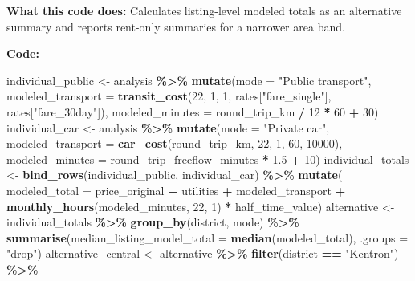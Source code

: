 \documentclass[
]{article}
\newenvironment{Shaded}{\begin{snugshade}}{\end{snugshade}}
\newcommand{\AttributeTok}[1]{\textcolor[rgb]{0.13,0.29,0.53}{#1}}
\newcommand{\DecValTok}[1]{\textcolor[rgb]{0.00,0.00,0.81}{#1}}
\newcommand{\FloatTok}[1]{\textcolor[rgb]{0.00,0.00,0.81}{#1}}
\newcommand{\FunctionTok}[1]{\textcolor[rgb]{0.13,0.29,0.53}{\textbf{#1}}}
\newcommand{\NormalTok}[1]{#1}
\newcommand{\OtherTok}[1]{\textcolor[rgb]{0.56,0.35,0.01}{#1}}
\newcommand{\SpecialCharTok}[1]{\textcolor[rgb]{0.81,0.36,0.00}{\textbf{#1}}}
\newcommand{\StringTok}[1]{\textcolor[rgb]{0.31,0.60,0.02}{#1}}
\begin{document}
\textbf{What this code does:} Calculates listing-level modeled totals as
an alternative summary and reports rent-only summaries for a narrower
area band.

\textbf{Code:}

\begin{Shaded}
\begin{Highlighting}[]
\NormalTok{individual\_public }\OtherTok{\textless{}{-}}\NormalTok{ analysis }\SpecialCharTok{\%\textgreater{}\%} \FunctionTok{mutate}\NormalTok{(}\AttributeTok{mode =} \StringTok{"Public transport"}\NormalTok{,}
  \AttributeTok{modeled\_transport =} \FunctionTok{transit\_cost}\NormalTok{(}\DecValTok{22}\NormalTok{, }\DecValTok{1}\NormalTok{, }\DecValTok{1}\NormalTok{, rates[}\StringTok{"fare\_single"}\NormalTok{], rates[}\StringTok{"fare\_30day"}\NormalTok{]),}
  \AttributeTok{modeled\_minutes =}\NormalTok{ round\_trip\_km }\SpecialCharTok{/} \DecValTok{12} \SpecialCharTok{*} \DecValTok{60} \SpecialCharTok{+} \DecValTok{30}\NormalTok{)}
\NormalTok{individual\_car }\OtherTok{\textless{}{-}}\NormalTok{ analysis }\SpecialCharTok{\%\textgreater{}\%} \FunctionTok{mutate}\NormalTok{(}\AttributeTok{mode =} \StringTok{"Private car"}\NormalTok{,}
  \AttributeTok{modeled\_transport =} \FunctionTok{car\_cost}\NormalTok{(round\_trip\_km, }\DecValTok{22}\NormalTok{, }\DecValTok{1}\NormalTok{, }\DecValTok{60}\NormalTok{, }\DecValTok{10000}\NormalTok{),}
  \AttributeTok{modeled\_minutes =}\NormalTok{ round\_trip\_freeflow\_minutes }\SpecialCharTok{*} \FloatTok{1.5} \SpecialCharTok{+} \DecValTok{10}\NormalTok{)}
\NormalTok{individual\_totals }\OtherTok{\textless{}{-}} \FunctionTok{bind\_rows}\NormalTok{(individual\_public, individual\_car) }\SpecialCharTok{\%\textgreater{}\%} \FunctionTok{mutate}\NormalTok{(}
  \AttributeTok{modeled\_total =}\NormalTok{ price\_original }\SpecialCharTok{+}\NormalTok{ utilities }\SpecialCharTok{+}\NormalTok{ modeled\_transport }\SpecialCharTok{+}
    \FunctionTok{monthly\_hours}\NormalTok{(modeled\_minutes, }\DecValTok{22}\NormalTok{, }\DecValTok{1}\NormalTok{) }\SpecialCharTok{*}\NormalTok{ half\_time\_value)}
\NormalTok{alternative }\OtherTok{\textless{}{-}}\NormalTok{ individual\_totals }\SpecialCharTok{\%\textgreater{}\%} \FunctionTok{group\_by}\NormalTok{(district, mode) }\SpecialCharTok{\%\textgreater{}\%}
  \FunctionTok{summarise}\NormalTok{(}\AttributeTok{median\_listing\_model\_total =} \FunctionTok{median}\NormalTok{(modeled\_total), }\AttributeTok{.groups =} \StringTok{"drop"}\NormalTok{)}
\NormalTok{alternative\_central }\OtherTok{\textless{}{-}}\NormalTok{ alternative }\SpecialCharTok{\%\textgreater{}\%} \FunctionTok{filter}\NormalTok{(district }\SpecialCharTok{==} \StringTok{"Kentron"}\NormalTok{) }\SpecialCharTok{\%\textgreater{}\%}

\end{Highlighting}
\end{Shaded}
\end{document}
